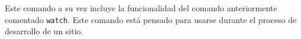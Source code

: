 
Este comando a su vez incluye la funcionalidad del comando anteriormente comentado \texttt{watch}. Este
comando está pensado para usarse durante el proceso de desarrollo de un sitio.


